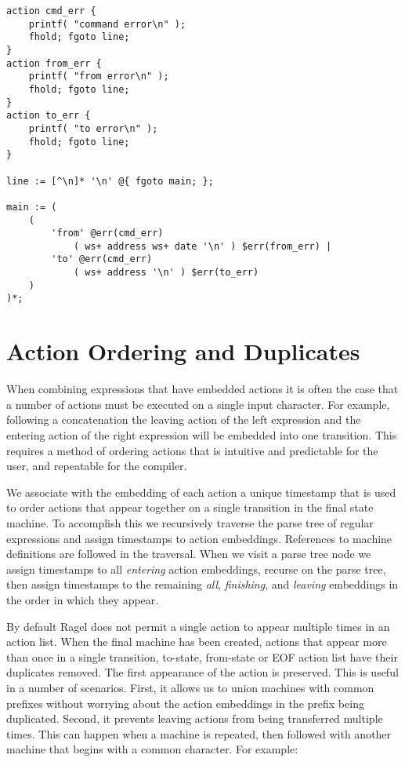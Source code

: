 \documentclass[letterpaper,11pt,oneside]{book}
\newenvironment{inline_code}{\def\baselinestretch{1}\vspace{12pt}\small}{}
\begin{document}
\begin{inline_code}
\begin{verbatim}
action cmd_err { 
    printf( "command error\n" ); 
    fhold; fgoto line;
}
action from_err { 
    printf( "from error\n" ); 
    fhold; fgoto line; 
}
action to_err { 
    printf( "to error\n" ); 
    fhold; fgoto line;
}

line := [^\n]* '\n' @{ fgoto main; };

main := (
    (
        'from' @err(cmd_err) 
            ( ws+ address ws+ date '\n' ) $err(from_err) |
        'to' @err(cmd_err)
            ( ws+ address '\n' ) $err(to_err)
    ) 
)*;
\end{verbatim}
\end{inline_code}



\section{Action Ordering and Duplicates}

When combining expressions that have embedded actions it is often the case that
a number of actions must be executed on a single input character. For example,
following a concatenation the leaving action of the left expression and the
entering action of the right expression will be embedded into one transition.
This requires a method of ordering actions that is intuitive and
predictable for the user, and repeatable for the compiler. 

We associate with the embedding of each action a unique timestamp that is
used to order actions that appear together on a single transition in the final
state machine. To accomplish this we recursively traverse the parse tree of
regular expressions and assign timestamps to action embeddings. References to
machine definitions are followed in the traversal. When we visit a
parse tree node we assign timestamps to all {\em entering} action embeddings,
recurse on the parse tree, then assign timestamps to the remaining {\em all},
{\em finishing}, and {\em leaving} embeddings in the order in which they
appear.

By default Ragel does not permit a single action to appear multiple times in an action
list. When the final machine has been created, actions that appear more than
once in a single transition, to-state, from-state or EOF action list have their
duplicates removed.
The first appearance of the action is preserved. This is useful in a number of
scenarios. First, it allows us to union machines with common prefixes without
worrying about the action embeddings in the prefix being duplicated. Second, it
prevents leaving actions from being transferred multiple times. This can
happen when a machine is repeated, then followed with another machine that
begins with a common character. For example:
\end{document}
